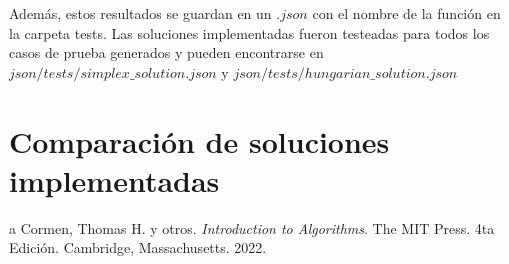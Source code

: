 \documentclass[10pt]{article} %
\begin{document}
	 Adem\'as, estos resultados se guardan en un $ .json $ con el nombre de la funci\'on en la carpeta tests. Las soluciones implementadas fueron testeadas para todos los casos de prueba generados y pueden encontrarse en $ json/tests/simplex\_solution.json $ y $ json/tests/hungarian\_solution.json $
	
	\section{Comparaci\'on de soluciones implementadas}
	
	\begin{thebibliography}
		a
		 Cormen, Thomas H. y otros. \emph{Introduction to Algorithms}. 
		The MIT Press.
		4ta Edici\'on.		
		Cambridge, Massachusetts.
		2022.
	\end{thebibliography}
\end{document}
